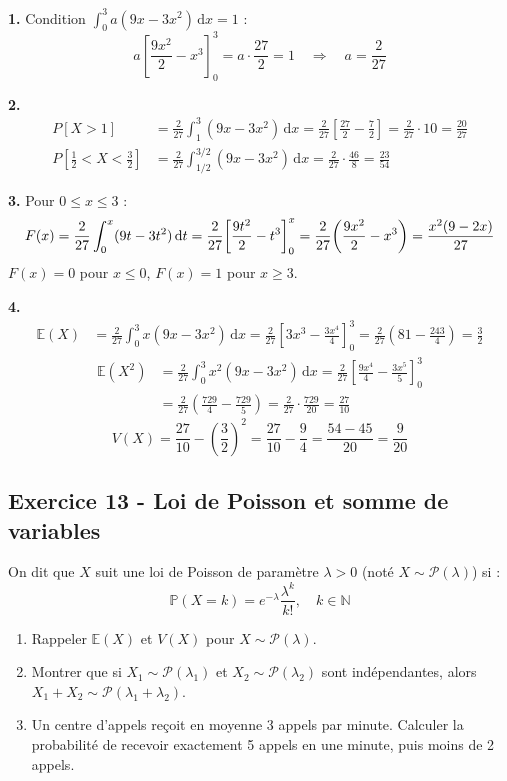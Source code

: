 \documentclass[12pt,a4paper]{article}
\begin{document}
\begin{boitecorrige}
\textbf{1.} Condition $\int_0^3 a(9x-3x^2)\,\mathrm{d}x = 1$ :
\[
a\left[\frac{9x^2}{2}-x^3\right]_0^3 = a\cdot\frac{27}{2} = 1 \quad\Rightarrow\quad \boxed{a = \frac{2}{27}}
\]

\textbf{2.}
\begin{align*}
P[X>1] &= \frac{2}{27}\int_1^3(9x-3x^2)\,\mathrm{d}x
= \frac{2}{27}\!\left[\frac{27}{2}-\frac{7}{2}\right] = \frac{2}{27}\cdot10 = \boxed{\frac{20}{27}}\\[6pt]
P\!\left[\tfrac{1}{2}<X<\tfrac{3}{2}\right] &= \frac{2}{27}\int_{1/2}^{3/2}(9x-3x^2)\,\mathrm{d}x
= \frac{2}{27}\cdot\frac{46}{8} = \boxed{\frac{23}{54}}
\end{align*}

\textbf{3.} Pour $0 \leq x \leq 3$ :
\[
F(x) = \frac{2}{27}\int_0^x(9t-3t^2)\,\mathrm{d} t
     = \frac{2}{27}\!\left[\frac{9t^2}{2}-t^3\right]_0^x
     = \frac{2}{27}\!\left(\frac{9x^2}{2}-x^3\right)
     = \frac{x^2(9-2x)}{27}
\]
$F(x)=0$ pour $x\leq0$, $F(x)=1$ pour $x\geq3$.

\textbf{4.}
\begin{align*}
\mathbb{E}(X) &= \frac{2}{27}\int_0^3 x(9x-3x^2)\,\mathrm{d}x = \frac{2}{27}\!\left[3x^3-\frac{3x^4}{4}\right]_0^3 = \frac{2}{27}\!\left(81-\frac{243}{4}\right) = \frac{3}{2}
\end{align*}
\begin{align*}
\mathbb{E}(X^2) &= \frac{2}{27}\int_0^3 x^2(9x-3x^2)\,\mathrm{d}x = \frac{2}{27}\!\left[\frac{9x^4}{4}-\frac{3x^5}{5}\right]_0^3\\
&= \frac{2}{27}\!\left(\frac{729}{4}-\frac{729}{5}\right) = \frac{2}{27}\cdot\frac{729}{20} = \frac{27}{10}
\end{align*}
\[
V(X) = \frac{27}{10} - \left(\frac{3}{2}\right)^2 = \frac{27}{10} - \frac{9}{4} = \frac{54-45}{20} = \boxed{\frac{9}{20}}
\]
\end{boitecorrige}

\subsection*{Exercice 13 - Loi de Poisson et somme de variables \niveau{\difficile}}

\begin{boiteexercice}
On dit que $X$ suit une loi de Poisson de paramètre $\lambda > 0$ (noté $X \sim \mathcal{P}(\lambda)$) si :
\[
\mathbb{P}(X=k) = e^{-\lambda}\frac{\lambda^k}{k!}, \quad k\in\mathbb{N}
\]
\begin{enumerate}
  \item Rappeler $\mathbb{E}(X)$ et $V(X)$ pour $X\sim\mathcal{P}(\lambda)$.
  \item Montrer que si $X_1\sim\mathcal{P}(\lambda_1)$ et $X_2\sim\mathcal{P}(\lambda_2)$ sont indépendantes, alors $X_1+X_2\sim\mathcal{P}(\lambda_1+\lambda_2)$.
  \item Un centre d'appels reçoit en moyenne 3 appels par minute. Calculer la probabilité de recevoir exactement 5 appels en une minute, puis moins de 2 appels.
\end{enumerate}
\end{boiteexercice}
\end{document}

